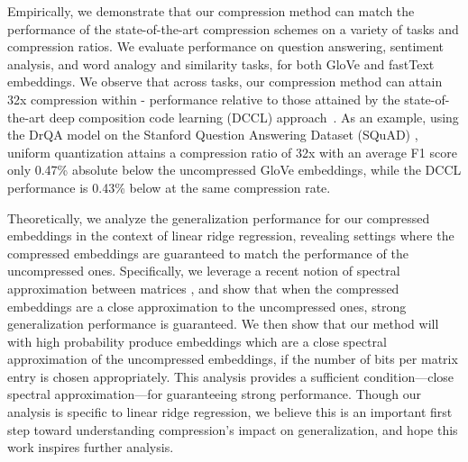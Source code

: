


Empirically, we demonstrate that our compression method can match the performance of the state-of-the-art compression schemes on a variety of tasks and compression ratios.
We evaluate performance on question answering, sentiment analysis, and word analogy and similarity tasks, for both GloVe \citep{glove14} and fastText \citep{fasttext18} embeddings.
We observe that across tasks, our compression method can attain 32x compression within - performance relative to those attained by the state-of-the-art deep composition code learning (DCCL) approach~\citep{dccl17}.
As an example, using the DrQA model \citep{drqa17} on the Stanford Question Answering Dataset (SQuAD) \citep{squad16}, uniform quantization attains a compression ratio of 32x with an average F1 score only 0.47\% absolute below the uncompressed GloVe embeddings, while the DCCL performance is 0.43\% below at the same compression rate.

Theoretically, we analyze the generalization performance for our compressed embeddings in the context of linear ridge regression, revealing settings where the compressed embeddings are guaranteed to match the performance of the uncompressed ones.
Specifically, we leverage a recent notion of spectral approximation between matrices \citep{avron17,lprff18}, and show that when the compressed embeddings are a close approximation to the uncompressed ones, strong generalization performance is guaranteed.
We then show that our method will with high probability produce embeddings which are a close spectral approximation of the uncompressed embeddings, if the number of bits per matrix entry is chosen appropriately.
This analysis provides a sufficient condition---close spectral approximation---for guaranteeing strong performance.
Though our analysis is specific to linear ridge regression, we believe this is an important first step toward understanding compression's impact on generalization, and hope this work inspires further analysis.



